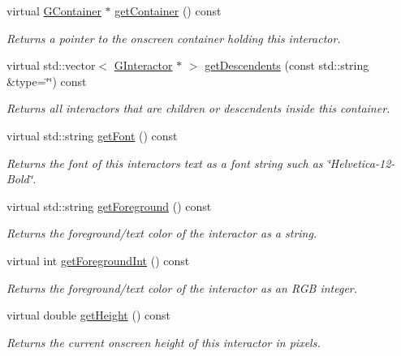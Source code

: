 \begin{DoxyCompactItemize}
virtual \mbox{\hyperlink{classsgl_1_1GContainer}{G\+Container}} $\ast$ \mbox{\hyperlink{classsgl_1_1GInteractor_a7a6e317c29d61030929b4cd2d1c00fe7}{get\+Container}} () const
\begin{DoxyCompactList}\small\item\em Returns a pointer to the onscreen container holding this interactor. \end{DoxyCompactList}\item 
virtual std\+::vector$<$ \mbox{\hyperlink{classsgl_1_1GInteractor}{G\+Interactor}} $\ast$ $>$ \mbox{\hyperlink{classsgl_1_1GContainer_a9580b7f6ee0dc339f75bafd4e319f3ad}{get\+Descendents}} (const std\+::string \&type=\char`\"{}\char`\"{}) const
\begin{DoxyCompactList}\small\item\em Returns all interactors that are children or descendents inside this container. \end{DoxyCompactList}\item 
virtual std\+::string \mbox{\hyperlink{classsgl_1_1GInteractor_a894a5502900794eeb27d084c21f1d77d}{get\+Font}} () const
\begin{DoxyCompactList}\small\item\em Returns the font of this interactor\textquotesingle{}s text as a font string such as \char`\"{}\+Helvetica-\/12-\/\+Bold\char`\"{}. \end{DoxyCompactList}\item 
virtual std\+::string \mbox{\hyperlink{classsgl_1_1GInteractor_a4fa2d8b0192a3a5b4af4bbfe71194d03}{get\+Foreground}} () const
\begin{DoxyCompactList}\small\item\em Returns the foreground/text color of the interactor as a string. \end{DoxyCompactList}\item 
virtual int \mbox{\hyperlink{classsgl_1_1GInteractor_ac3b12ab385a6ef9ae90fc879860ba726}{get\+Foreground\+Int}} () const
\begin{DoxyCompactList}\small\item\em Returns the foreground/text color of the interactor as an R\+GB integer. \end{DoxyCompactList}\item 
virtual double \mbox{\hyperlink{classsgl_1_1GInteractor_a1e7e353362434072875264cf95629f99}{get\+Height}} () const
\begin{DoxyCompactList}\small\item\em Returns the current onscreen height of this interactor in pixels. \end{DoxyCompactList}\item 

\end{DoxyCompactItemize}
